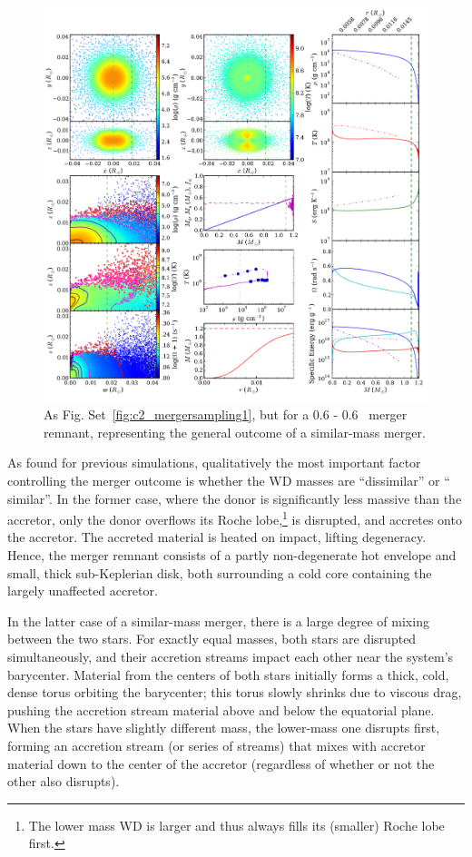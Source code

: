 \begin{figure}
\centering
\includegraphics[width=1.0\columnwidth]{chapter2_zhu+13/figures/pt6pt6.pdf}
\caption{As Fig. Set~\ref{fig:c2_mergersampling1}, but for a 0.6 - 0.6 \Msun\ merger remnant, representing the general outcome of a similar-mass merger.}
\label{fig:c2_mergersampling2}
\end{figure}

As found for previous simulations, qualitatively the most important factor controlling the merger outcome is whether the WD masses are ``dissimilar'' or `` similar''.  In the former case, where the donor is significantly less massive than the accretor, only the donor overflows its Roche lobe,\footnote{The lower mass WD is larger and thus always fills its (smaller) Roche lobe first.} is disrupted, and accretes onto the accretor.  The accreted material is heated on impact, lifting degeneracy.  Hence, the merger remnant consists of a partly non-degenerate hot envelope and small, thick sub-Keplerian disk, both surrounding a cold core containing the largely unaffected accretor.

In the latter case of a similar-mass merger, there is a large degree of mixing between the two stars.  For exactly equal masses, both stars are disrupted simultaneously, and their accretion streams impact each other near the system's barycenter.  Material from the centers of both stars initially forms a thick, cold, dense torus orbiting the barycenter; this torus slowly shrinks due to viscous drag, pushing the accretion stream material above and below the equatorial plane.  When the stars have slightly different mass, the lower-mass one disrupts first, forming an accretion stream (or series of streams) that mixes with accretor material down to the center of the accretor (regardless of whether or not the other also disrupts).


